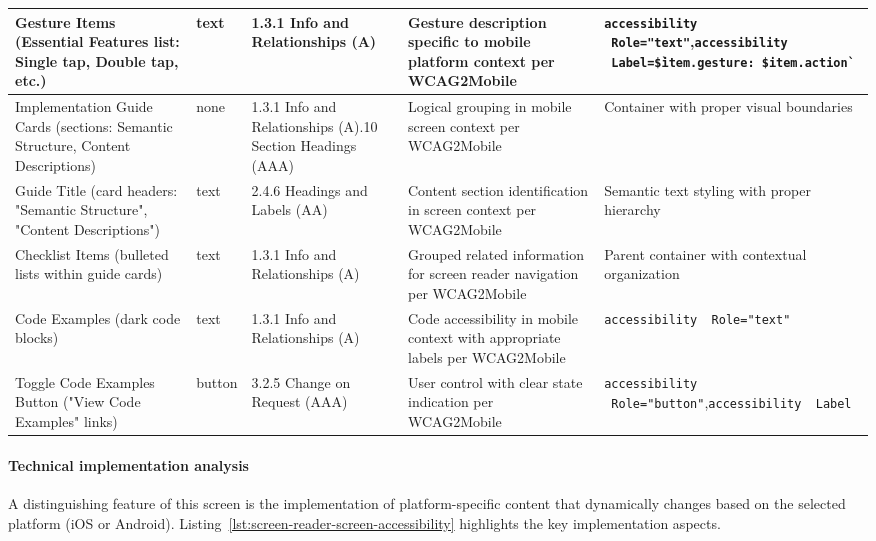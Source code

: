 \begin{longtable}[c]{|C{2.5cm}|C{2cm}|C{2.8cm}|C{3.5cm}|C{4.7cm}|}
\hline
Gesture Items (Essential Features list: Single tap, Double tap, etc.) & text & 1.3.1 Info and Relationships (A) & Gesture description specific to mobile platform context per WCAG2Mobile & \texttt{accessibility \ Role="text"},\newline \texttt{accessibility \ Label=\`\${item.gesture}: \${item.action}\`} \\
\hline
Implementation Guide Cards (sections: Semantic Structure, Content Descriptions) & none & 1.3.1 Info and Relationships (A).10 Section Headings (AAA) & Logical grouping in mobile screen context per WCAG2Mobile & Container with proper visual boundaries \\
\hline
Guide Title (card headers: "Semantic Structure", "Content Descriptions") & text & 2.4.6 Headings and Labels (AA) & Content section identification in screen context per WCAG2Mobile & Semantic text styling with proper hierarchy \\
\hline
Checklist Items (bulleted lists within guide cards) & text & 1.3.1 Info and Relationships (A) & Grouped related information for screen reader navigation per WCAG2Mobile & Parent container with contextual organization \\
\hline
Code Examples (dark code blocks) & text & 1.3.1 Info and Relationships (A) & Code accessibility in mobile context with appropriate labels per WCAG2Mobile & \texttt{accessibility \ Role="text"} \\
\hline
Toggle Code Examples Button ("View Code Examples" links) & button & 3.2.5 Change on Request (AAA) & User control with clear state indication per WCAG2Mobile & \texttt{accessibility \ Role="button"},\newline \texttt{accessibility \ Label} \\
\hline
\end{longtable}
\FloatBarrier

\paragraph{Technical implementation analysis}

A distinguishing feature of this screen is the implementation of platform-specific content that dynamically changes based on the selected platform (iOS or Android). Listing~\ref{lst:screen-reader-screen-accessibility} highlights the key implementation aspects.

